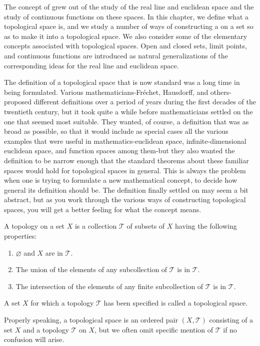 
The concept of  grew out of the study of the real line and euclidean space and the study of continuous functions on these spaces. In this chapter, we define what a topological space is, and we study a number of ways of constructing a  on a set so as to make it into a topological space. We also consider some of the elementary concepts associated with topological spaces. Open and closed sets, limit points, and continuous functions are introduced as natural generalizations of the corresponding ideas for the real line and euclidean space.


The definition of a topological space that is now standard was a long time in being formulated. Various mathematicians-Fréchet, Hausdorff, and others-proposed different definitions over a period of years during the first decades of the twentieth century, but it took quite a while before mathematicians settled on the one that seemed most suitable. They wanted, of course, a definition that was as broad as possible, so that it would include as special cases all the various examples that were useful in mathematics-euclidean space, infinite-dimensional euclidean space, and function spaces among them-but they also wanted the definition to be narrow enough that the standard theorems about these familiar spaces would hold for topological spaces in general. This is always the problem when one is trying to formulate a new mathematical concept, to decide how general its definition should be. The definition finally settled on may seem a bit abstract, but as you work through the various ways of constructing topological spaces, you will get a better feeling for what the concept means.

\begin{definition}
 A topology on a set \(X\) is a collection \(\mathcal{T}\) of subsets of \(X\) having the following properties:

 \begin{enumerate}[itemsep=0.2em, parsep=0pt, topsep=0pt, partopsep=0pt, leftmargin=*, label=(\arabic*), align=left]
 \item \(\varnothing\) and \(X\) are in \(\mathcal{T}\).
 \item The union of the elements of any subcollection of \(\mathcal{T}\) is in \(\mathcal{T}\).
 \item The intersection of the elements of any finite subcollection of \(\mathcal{T}\) is in \(\mathcal{T}\).
 \end{enumerate}
 A set \(X\) for which a topology \(\mathcal{T}\) has been specified is called a topological space.

 Properly speaking, a topological space is an ordered pair \((X, \mathcal{T})\) consisting of a set \(X\) and a topology \(\mathcal{T}\) on \(X\), but we often omit specific mention of \(\mathcal{T}\) if no confusion will arise.
\end{definition}


